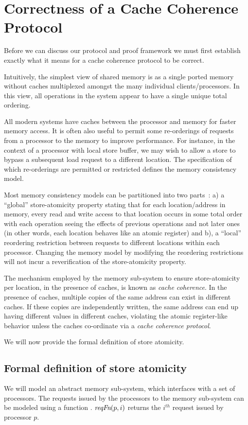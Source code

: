 \section{Correctness of a Cache Coherence Protocol}
\label{Sec:Background}

Before we can discuss our protocol and proof framework we must first establish
exactly what it means for a cache coherence protocol to be correct. 

Intuitively, the simplest view of shared memory is as a single ported memory
without caches multiplexed amongst the many individual clients/processors. In
this view, all operations in the system appear to have a single unique total
ordering.

All modern systems have caches between the processor and memory for faster
memory access.  It is often also useful to permit some re-orderings of requests
from a processor to the memory to improve performance.  For instance, in the
context of a processor with local store buffer, we may wish to allow a store to
bypass a subsequent load request to a different location. The specification of
which re-orderings are permitted or restricted defines the memory consistency
model.

Most memory consistency models can be partitioned into two
parts~\cite{Arvind-memory-model}: a) a ``global'' store-atomicity property
stating that for each location/address in memory, every read and write access
to that location occurs in some total order with each operation seeing the
effects of previous operations and not later ones (in other words, each
location behaves like an atomic register) and b), a ``local'' reordering
restriction between requests to different locations within each processor.
Changing the memory model by modifying the reordering restrictions will not
incur a reverification of the store-atomicity property.

The mechanism employed by the memory sub-system to ensure store-atomicity per
location, in the presence of caches, is known as \emph{cache coherence}. In the
presence of caches, multiple copies of the same address can exist in different
caches. If these copies are independently written, the same address can end up
having different values in different caches, violating the atomic register-like
behavior unless the caches co-ordinate via a \emph{cache coherence protocol}.

We will now provide the formal definition of store atomicity.

\subsection{Formal definition of store atomicity}
We will model an abstract memory sub-system, which interfaces with a set of
processors. The requests issued by the processors to the memory sub-system can
be modeled using a function \reqFn. $\textit{reqFn}(p, i)$ returns the $i^{th}$ request
issued by processor $p$.

